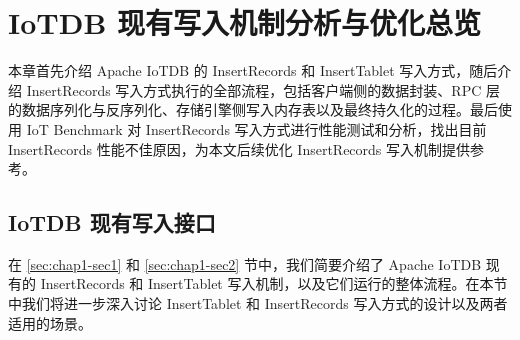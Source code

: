 
\chapter{IoTDB 现有写入机制分析与优化总览}
本章首先介绍 Apache IoTDB 的  InsertRecords 和 InsertTablet 写入方式，随后介绍 InsertRecords 写入方式执行的全部流程，包括客户端侧的数据封装、RPC 层的数据序列化与反序列化、存储引擎侧写入内存表以及最终持久化的过程。最后使用 IoT Benchmark 对 InsertRecords 写入方式进行性能测试和分析，找出目前 InsertRecords 性能不佳原因，为本文后续优化 InsertRecords 写入机制提供参考。
\section{IoTDB 现有写入接口}
在 \ref{sec:chap1-sec1} 和 \ref{sec:chap1-sec2} 节中，我们简要介绍了 Apache IoTDB 现有的 InsertRecords 和 InsertTablet 写入机制，以及它们运行的整体流程。在本节中我们将进一步深入讨论 InsertTablet 和 InsertRecords 写入方式的设计以及两者适用的场景。

